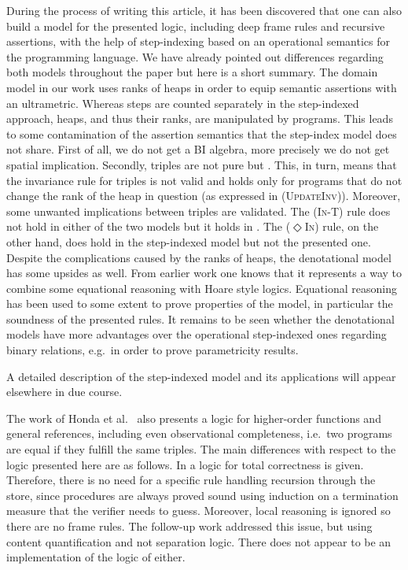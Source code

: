 \documentclass{LMCS}
\theoremstyle{remark}
\newcommand{\ALMOSTPURE}{\text{pseudo pure}\xspace}
\begin{document}
 
   During the process of writing this article,  it has been discovered that one can also build a model for the presented logic, including deep frame rules and recursive assertions,  with the help of step-indexing \cite{Appel:McAllester:01} based on an operational semantics for the programming language. We have already  pointed out differences regarding both models  throughout the paper but here is a short summary. The domain model in our work uses 
   ranks of heaps in order to equip semantic assertions with an ultrametric.  Whereas  steps are counted separately in the step-indexed approach,  heaps, and thus their ranks, are manipulated by programs. This leads to  some contamination of the assertion semantics
   that the step-index model does not share. First of all, we do not get a BI algebra, more 
   precisely we do not get spatial implication. Secondly, triples are not pure but \ALMOSTPURE. This, in turn, means that the invariance rule for triples is not valid and holds only for programs that do not change the rank of the heap in question (as expressed in (\textsc{UpdateInv})). Moreover,
    some unwanted implications between triples are validated. The (\textsc{In-T}) rule  does not hold in either of the two models but it holds in \cite{Honda:Yoshida:Berger:05}. The (\textsc{$\Diamond$In}) rule, on the other hand, does hold in the step-indexed model but not the presented one. Despite the complications caused by the ranks of heaps, the  denotational model has some upsides as well. 
From earlier work one knows that it represents a way to combine some equational reasoning  with Hoare style logics. Equational reasoning has been used to some extent to prove properties of the model, in particular the soundness of the presented rules.
It remains to be seen whether the denotational models have more advantages over the operational step-indexed ones regarding binary relations, e.g.\ in order to prove parametricity results.  


A detailed description of the step-indexed model and its applications will appear elsewhere in due course.

The work of Honda et al.~\cite{Honda:Yoshida:Berger:05} also presents a logic for higher-order functions and general references, including even observational completeness, i.e.\ two programs are equal if they fulfill the same triples. The main differences with respect to  the logic presented here are as follows. In  \cite{Honda:Yoshida:Berger:07} a logic for total correctness is given. Therefore, there is no  need for a specific rule handling recursion through the store, since procedures are always proved sound using induction  on a termination measure that the verifier needs to guess. Moreover,
 local reasoning is ignored so there are no frame rules. The follow-up work \cite{Honda:Yoshida:Berger:07} addressed this issue, but using content quantification and not separation logic. There does not appear to be an implementation of the logic of  \cite{Honda:Yoshida:Berger:07} either.
\end{document}
